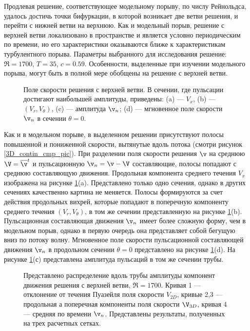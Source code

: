 Продлевая решение, соответствующее модельному порыву, по числу Рейнольдса, удалось достичь точки бифуркации, в которой возникает две ветви решения, и перейти с нижней ветви на верхнюю. Как и модельный порыв, решение с верхней ветви локализовано в пространстве и является условно периодическим по времени, но его характеристики оказываются ближе к характеристикам турбулентного порыва. Параметры выбранного для исследования решение: $\Re = 1700$, $T = 35$, $c = 0.59$. Особенности, выделенные при изучении модельного порыва, могут быть в полной мере обобщены на решение с верхней ветви. 


\begin{figure}
\caption{Поле скорости решения с верхней ветви. В сечении, где пульсации достигают наибольшей амплитуды, приведены: (a) --- $V_{x}$, (b) --- $(V_{r}, V_{\theta})$, (c) --- амплитуда $\v_n$; (d) --- мгновенное поле скорости $\v_n$ в сечении $\theta = 0$. }
\label{local_ub_means_pic}
\end{figure}


Как и в модельном порыве, в выделенном решении присутствуют полосы повышенной и пониженной скорости, вытянутые вдоль потока (смотри рисунок \ref{3D_contin_cmp_pic}). При разделении поля скорости решения $\v$ на среднюю $\V = \overline{\v}^t$ и пульсационную $\v_n = \v - \V$ составляющие, полосы попадают с среднюю составляющую движения. Продольная компонента среднего течения $V_x$ изображена на рисунке \ref{local_ub_means_pic}(a). Представлено только одно сечения, однако в других сечениях качественно картина не меняется. Полосы формируются за счет действия продольных вихрей, которые попадают в поперечную компоненту среднего течения $(V_r, V_\theta)$, в том же сечении представленную на рисунке \ref{local_ub_means_pic}(b). Пульсационная составляющая движения $\v_n$ имеет более сложную форму, чем в модельном порыв, однако в первую очередь она представляет собой бегущую вниз по потоку волну. Мгновенное поле скорости пульсационной составляющей движения $\v_n$ в продольном сечении $\theta = 0$ представлено на рисунке \ref{local_ub_means_pic}(d). На рисунке \ref{local_ub_means_pic}(с) представлена амплитуда пульсаций в том же сечении трубы. 


\begin{figure}
\caption{Представлено распределение вдоль трубы амплитуды компонент движения решения с верхней ветви, $\Re = 1700$. Кривая 1 --- отклонение от течения Пуазейля поля скорости $V_{2D}$, кривые 2,3 --- продольная а поперечная компоненты поля скорости $\V_{3D}$, кривая 4 --- средняя по времени $\v_n$. Представлены результаты, полученных на трех расчетных сетках.}
\label{amp_ub_pic}
\end{figure}


